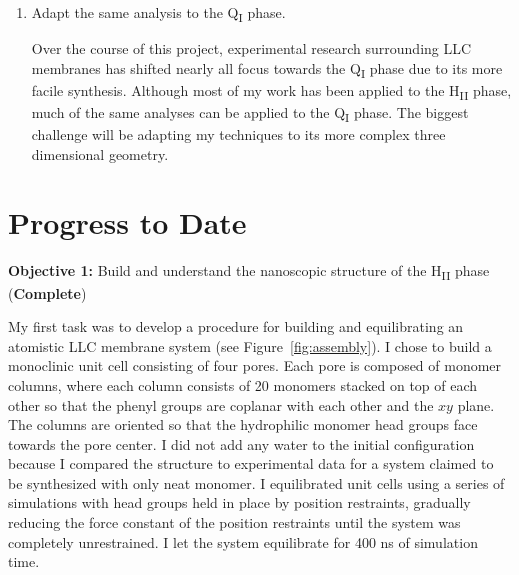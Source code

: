 \documentclass{article}
\begin{document}
\begin{enumerate}
    \item Adapt the same analysis to the Q\textsubscript{I} phase.
    
    Over the course of this project, experimental research surrounding
    LLC membranes has shifted nearly all focus towards the Q\textsubscript{I}
    phase due to its more facile synthesis.	Although most of my work has 
    been applied to the H\textsubscript{II} phase, much of the same analyses
    can be applied to the Q\textsubscript{I} phase. The biggest challenge will
    be adapting my techniques to its more complex three dimensional geometry.
    
%    
    
  \end{enumerate}

  \section{Progress to Date}\label{section:progress}
  
  \textbf{\large Objective 1:} {\large Build and understand the nanoscopic structure
  of the H\textsubscript{II} phase} (\textcolor{green!40!olive}{\textbf{Complete}})
  
  My first task was to develop a procedure for building and equilibrating 
  an atomistic LLC membrane system (see Figure~\ref{fig:assembly}). I chose to build
  a monoclinic unit cell consisting of four pores. Each pore is composed of monomer
  columns, where each column consists of 20 monomers stacked on top of each other
  so that the phenyl groups are coplanar with each other and the $xy$ plane. The
  columns are oriented so that the hydrophilic monomer head groups face towards
  the pore center. I did not add any water to the initial configuration because I
  compared the structure to experimental data for a system claimed to be
  synthesized with only neat monomer. I equilibrated unit cells using a series
  of simulations with head groups held in place by position restraints, gradually
  reducing the force constant of the position restraints until the system
  was completely unrestrained. I let the system equilibrate for 400 ns of simulation
  time.
  
\end{document}
